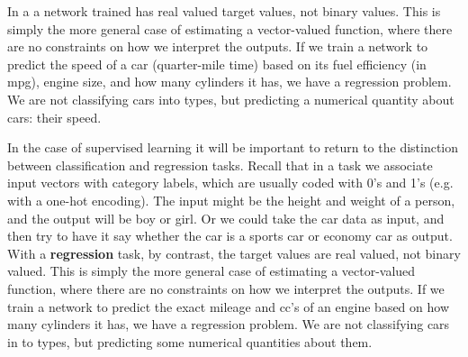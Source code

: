 In a  a  network trained has real valued target values, not binary values. This is simply the more general case of estimating a vector-valued function, where there are no constraints on how we interpret the outputs. If we train a network to predict the speed of a car (quarter-mile time) based on its fuel efficiency (in mpg), engine size, and how many cylinders it has, we have a regression problem. We are not classifying cars into types, but predicting a numerical quantity about cars: their speed.

In the case of supervised learning it will be important to return to the distinction between classification and regression tasks. Recall that in a  task we associate input vectors with category labels, which are usually coded with 0's and 1's (e.g. with a one-hot encoding). The input might be the height and weight of a person, and the output will be boy or girl. Or we could take the car data as input, and then try to have it say whether the car is a sports car or economy car as output. With a \textbf{regression} task, by contrast, the target values are  real valued, not binary valued. This is simply the more general case of estimating a vector-valued function, where there are no constraints on how we interpret the outputs. If we train a network to predict the exact mileage and cc's of an engine based on how many cylinders it has, we have a regression problem. We are not classifying cars in to types, but predicting some numerical quantities about them. 

